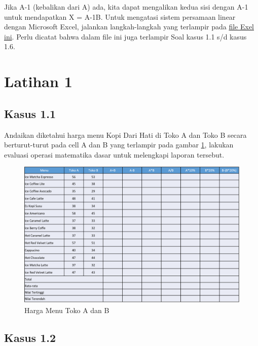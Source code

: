 \documentclass[
]{book}
\begin{document}
Jika A-1 (kebalikan dari A) ada, kita dapat mengalikan kedua sisi dengan A-1 untuk mendapatkan X = A-1B. Untuk mengatasi sistem persamaan linear dengan Microsoft Excel, jalankan langkah-langkah yang terlampir pada \href{https://github.com/Bakti-Siregar/Matematika-Bisnis/raw/master/data/dasar-matematika-bisnis.xlsx}{file Exel ini}. Perlu dicatat bahwa dalam file ini juga terlampir Soal kasus 1.1 s/d kasus 1.6.

\hypertarget{latihan-1}{%
\section{Latihan 1}\label{latihan-1}}

\hypertarget{kasus-1.1}{%
\subsection*{Kasus 1.1}\label{kasus-1.1}}

Andaikan diketahui harga menu Kopi Dari Hati di Toko A dan Toko B secara berturut-turut pada cell A dan B yang terlampir pada gambar \ref{fig:tabel1}, lakukan evaluasi operasi matematika dasar untuk melengkapi laporan tersebut.

\begin{figure}

{\centering \includegraphics[width=1\linewidth]{images/tabel1} 

}

\caption{Harga Menu Toko A dan B}\label{fig:tabel1}
\end{figure}

\hypertarget{kasus-1.2}{%
\subsection*{Kasus 1.2}\label{kasus-1.2}}
\end{document}
